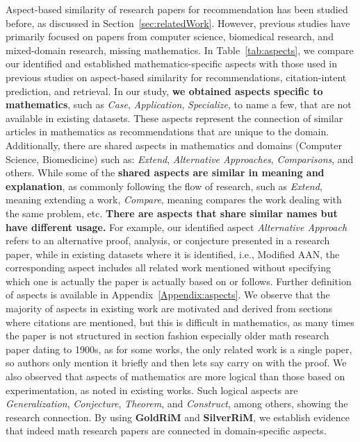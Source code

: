 \documentclass[sigconf,anonymous]{acmart}
\begin{document}
Aspect-based similarity of research papers for recommendation has been studied before, as discussed in Section~\ref{sec:relatedWork}.
However, previous studies have primarily focused on papers from computer science, biomedical research, and mixed-domain research, missing mathematics.
In Table~\ref{tab:aspects}, we compare our identified and established mathematics-specific aspects with those used in previous studies on aspect-based similarity for recommendations, citation-intent prediction, and retrieval.
In our study, \textbf{we obtained aspects specific to mathematics}, such as \textit{Case}, \textit{Application}, \textit{Specialize}, to name a few, that are not available in existing datasets.
These aspects represent the connection of similar articles in mathematics as recommendations that are unique to the domain.
Additionally, there are shared aspects in mathematics and domains (Computer Science, Biomedicine) such as: \textit{Extend}, \textit{Alternative Approaches}, \textit{Comparisons}, and others.
While some of the \textbf{shared aspects are similar in meaning and explanation}, as commonly following the flow of research, such as \textit{Extend}, meaning extending a work, \textit{Compare}, meaning compares the work dealing with the same problem, etc. 
\textbf{There are aspects that share similar names but have different usage.}
For example, our identified aspect \textit{Alternative Approach} refers to an alternative proof, analysis, or conjecture presented in a research paper, while in existing datasets where it is identified, i.e., Modified AAN, the corresponding aspect includes all related work mentioned without specifying which one is actually the paper is actually based on or follows.
Further definition of aspects is available in Appendix~\ref{Appendix:aspects}.
We observe that the majority of aspects in existing work are motivated and derived from sections where citations are mentioned, but this is difficult in mathematics, as many times the paper is not structured in section fashion especially older math research paper dating to 1900s, as for some works, the only related work is a single paper, so authors only mention it briefly and then lets say carry on with the proof.
We also observed that aspects of mathematics are more logical than those based on experimentation, as noted in existing works.
Such logical aspects are \textit{Generalization}, \textit{Conjecture}, \textit{Theorem}, and \textit{Construct}, among others, showing the research connection. 
By using \textbf{GoldRiM} and \textbf{SilverRiM}, we establish evidence that indeed math research papers are connected in domain-specific aspects. 
\end{document}
